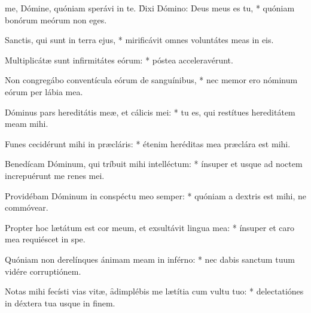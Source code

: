 \begin{psalmus}

     me, Dómine, quóniam sperávi in te. \f Dixi Dómino: Deus meus es tu, * quóniam bonórum meórum non eges.

    Sanctis, qui sunt in terra ejus, * mirificávit omnes voluntátes meas in eis.

    Multiplicátæ sunt infirmitátes eórum: * póstea acceleravérunt.

    Non congregábo conventícula eórum de sanguínibus, * nec memor ero nóminum eórum per lábia mea.

    Dóminus pars hereditátis meæ, et cálicis mei: * tu es, qui restítues hereditátem meam mihi.

    Funes cecidérunt mihi in præcláris: * étenim heréditas mea præclára est mihi.

    Benedícam Dóminum, qui tríbuit mihi intelléctum: * ínsuper et usque ad noctem increpuérunt me renes mei.

    Providébam Dóminum in conspéctu meo semper: * quóniam a dextris est mihi, ne commóvear.

    Propter hoc lætátum est cor meum, et exsultávit lingua mea: * ínsuper et caro mea requiéscet in spe.

    Quóniam non derelínques ánimam meam in inférno: * nec dabis sanctum tuum vidére corruptiónem.

    Notas mihi fecísti vias vitæ, \f adimplébis me lætítia cum vultu tuo: * delectatiónes in déxtera tua usque in finem.

\end{psalmus}
